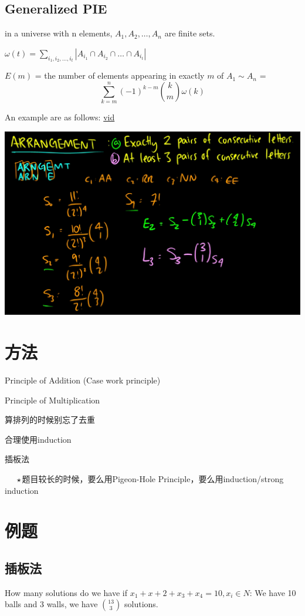 \documentclass[12pt,a4paper]{ctexrep}
\begin{document}
\subsection{Generalized PIE}
in a universe with n elements, $A_{1}, A_{2}, \dots , A_{n}$ are finite sets.

$\omega(t) = \sum_{i_{1},i_{2},\dots,i_{t}}|A_{i_{1}} \cap A_{i_{2}} \cap \dots \cap A_{i_{t}}|$

$E(m)$ = the number of elements appearing in exactly $m$ of $A_{1} \sim A_{n}$ = \[\sum_{k=m}^{n} (-1)^{k-m} \binom{k}{m} \omega(k)\]

An example are as follows:  \href{https://www.youtube.com/watch?v=D1T3xy_vtxU}{vid}

\begin{center}
\includegraphics[scale=0.3]{PIE_Example.png}
\end{center}

\section{方法}
Principle of Addition (Case work principle)

Principle of Multiplication

算排列的时候别忘了去重

合理使用induction

插板法

$\indent\star$题目较长的时候，要么用Pigeon-Hole Principle，要么用induction/strong induction

\section{例题}
\subsection{插板法}
How many solutions do we have if $x_1+x+2+x_3+x_4 = 10, x_i \in N$: We have 10 balls and 3 walls, we have $\binom{13}{3}$ solutions.
\end{document}
